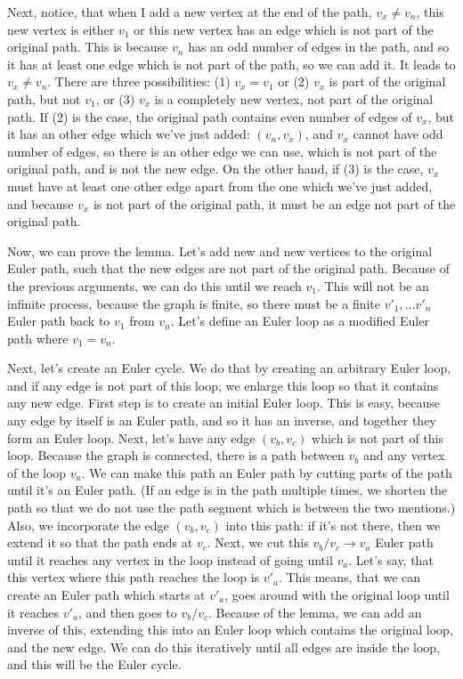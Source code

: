 \documentclass[a4paper,12pt]{article}
\begin{document}
    Next, notice, that when I add a new vertex at the end of the path, $v_x \neq v_n$, this new vertex is either $v_1$ or this new vertex has an edge which is not part of the original path. This is because $v_n$ has an odd number of edges in the path, and so it has at least one edge which is not part of the path, so we can add it. It leads to $v_x \neq v_n$.
    There are three possibilities: (1) $v_x = v_1$ or (2) $v_x$ is part of the original path, but not $v_1$, or (3) $v_x$ is a completely new vertex, not part of the original path. If (2) is the case, the original path contains even number of edges of $v_x$, but it has an other edge which we've just added: $(v_n, v_x)$, and $v_x$ cannot have odd number of edges, so there is an other edge we can use, which is not part of the original path, and is not the new edge. On the other hand, if (3) is the case, $v_x$ must have at least one other edge apart from the one which we've just added, and because $v_x$ is not part of the original path, it must be an edge not part of the original path.

    Now, we can prove the lemma. Let's add new and new vertices to the original Euler path, such that the new edges are not part of the original path. Because of the previous arguments, we can do this until we reach $v_1$. This will not be an infinite process, because the graph is finite, so there must be a finite $v'_1, \ldots v'_n$ Euler path back to $v_1$ from $v_n$. Let's define an Euler loop as a modified Euler path where $v_1 = v_n$.

    Next, let's create an Euler cycle. We do that by creating an arbitrary Euler loop, and if any edge is not part of this loop, we enlarge this loop so that it contains any new edge. First step is to create an initial Euler loop. This is easy, because any edge by itself is an Euler path, and so it has an inverse, and together they form an Euler loop. Next, let's have any edge $(v_b, v_c)$ which is not part of this loop. Because the graph is connected, there is a path between $v_b$ and any vertex of the loop $v_a$. We can make this path an Euler path by cutting parts of the path until it's an Euler path. (If an edge is in the path multiple times, we shorten the path so that we do not use the path segment which is between the two mentions.) Also, we incorporate the edge $(v_b, v_c)$ into this path: if it's not there, then we extend it so that the path ends at $v_c$. Next, we cut this $v_b/v_c \rightarrow v_a$ Euler path until it reaches any vertex in the loop instead of going until $v_a$. Let's say, that this vertex where this path reaches the loop is $v'_a$. This means, that we can create an Euler path which starts at $v'_a$, goes around with the original loop until it reaches $v'_a$, and then goes to $v_b/v_c$. Because of the lemma, we can add an inverse of this, extending this into an Euler loop which contains the original loop, and the new edge. We can do this iteratively until all edges are inside the loop, and this will be the Euler cycle.
\end{document}
